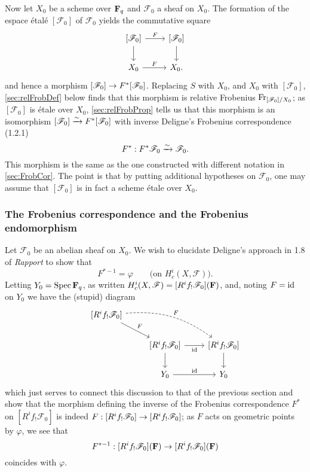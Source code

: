 \documentclass[deligne.tex]{subfiles}
\begin{document}
Now let $X_0$ be a scheme over $\mathbf{F}_q$ and $\mathscr F_0$ a sheaf on $X_0$.
The formation of the espace étalé $[\mathscr F_0]$ of $\mathscr F_0$ yields
the commutative square
\begin{equation*}\begin{tikzcd}[]
	{[\mathscr F_0]}\arrow[r,"F"]\arrow[d]&{[\mathscr F_0]}\arrow[d] \\
	X_0\arrow[r,"F"]&X_0.
\end{tikzcd}\end{equation*}
and hence a morphism $[\mathscr F_0]\rightarrow F^*[\mathscr F_0]$.
Replacing $S$ with $X_0$, and $X_0$ with $[\mathscr F_0]$, 
\ref{sec:relFrobDef} below finds that this morphism is
relative Frobenius $\operatorname{Fr}_{[\mathscr F_0]/X_0}$; as $[\mathscr F_0]$ is étale
over $X_0$, \ref{sec:relFrobProp} tells us that this morphism is an
isomorphism $[\mathscr F_0]\xrightarrow\sim F^*[\mathscr F_0]$ with inverse
Deligne's Frobenius correspondence (1.2.1)
\begin{equation*}
	F^*:F^*\mathscr F_0\xrightarrow\sim\mathscr F_0.
\end{equation*}
This morphism is the same as the one constructed with different notation in
\ref{sec:FrobCor}.
The point is that by putting additional hypotheses on $\mathscr F_0$, one
may assume that $[\mathscr F_0]$ is in fact a scheme étale over $X_0$.

\subsubsection{The Frobenius correspondence and the Frobenius endomorphism}
Let $\mathscr F_0$ be an abelian sheaf on $X_0$. We wish to elucidate
Deligne's approach in 1.8 of \emph{Rapport} to show that
\begin{equation*}
	F^{*-1}=\varphi\qquad\text{(on $H_c^i(X,\mathscr F)$)}.
\end{equation*}
Letting $Y_0=\operatorname{Spec}\mathbf{F}_q$, as written
$H_c^i(X,\mathscr F)=[R^if_!\mathscr F_0](\mathbf{F})$, and, noting $F=\operatorname{id}$ on 
$Y_0$ we have the (stupid) diagram
\begin{equation*}
\begin{tikzcd}
&{[R^if_!\mathscr F_0]}\arrow[dr,"F"]\arrow[drr, dashed,"F",bend left=20] \\
&&{[R^if_!\mathscr F_0]}\arrow[r,"\id"']\arrow[d] &{[R^if_!\mathscr F_0]}\arrow[d] \\
&&Y_0\arrow[r,"\id"] &Y_0
\end{tikzcd}
\end{equation*}
which just serves to connect this discussion to that of the previous section 
and show that the morphism defining the inverse of the
Frobenius correspondence $F^*$ on $[R^if_!\mathscr F_0]$ is indeed
$F:[R^if_!\mathscr F_0]\rightarrow [R^if_!\mathscr F_0]$; as
$F$ acts on geometric points by $\varphi$, we see that
\begin{equation*}
	F^{*-1}:[R^if_!\mathscr F_0](\mathbf{F})\rightarrow [R^if_!\mathscr F_0](\mathbf{F})
\end{equation*}
coincides with $\varphi$.
\end{document}

